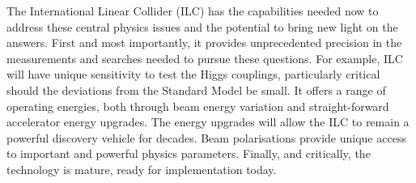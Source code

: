 \documentclass[%
 reprint,
 amsmath,amssymb,
 aps,
]{revtex4-1}
\begin{document}

The International Linear Collider (ILC) has the capabilities needed now to address these central physics issues and the potential to bring new light on the answers.  First and most importantly, it provides unprecedented precision in the measurements and searches needed to pursue these questions.  For example, ILC will have unique sensitivity to test the 
Higgs couplings, particularly critical should the deviations 
from the Standard Model be small. It offers a range of 
operating energies, both through beam energy variation 
and straight-forward accelerator energy upgrades.  
The energy upgrades will allow the ILC to remain a powerful 
discovery vehicle for decades. Beam polarisations provide 
unique access to important and powerful physics parameters. 
Finally, and critically, the technology is mature, 
ready for implementation today.
\end{document}
